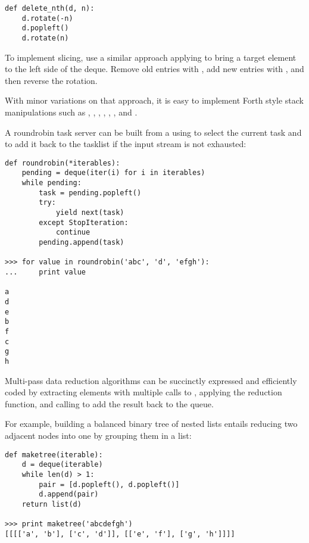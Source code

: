 \begin{verbatim}
def delete_nth(d, n):
    d.rotate(-n)
    d.popleft()
    d.rotate(n)
\end{verbatim}

To implement  slicing, use a similar approach applying
 to bring a target element to the left side of the deque.
Remove old entries with , add new entries with
, and then reverse the rotation.

With minor variations on that approach, it is easy to implement Forth style
stack manipulations such as , , , ,
, , and .

A roundrobin task server can be built from a  using
 to select the current task and 
to add it back to the tasklist if the input stream is not exhausted:

\begin{verbatim}
def roundrobin(*iterables):
    pending = deque(iter(i) for i in iterables)
    while pending:
        task = pending.popleft()
        try:
            yield next(task)
        except StopIteration:
            continue
        pending.append(task)

>>> for value in roundrobin('abc', 'd', 'efgh'):
...     print value

a
d
e
b
f
c
g
h

\end{verbatim}


Multi-pass data reduction algorithms can be succinctly expressed and
efficiently coded by extracting elements with multiple calls to
, applying the reduction function, and calling
 to add the result back to the queue.

For example, building a balanced binary tree of nested lists entails
reducing two adjacent nodes into one by grouping them in a list:

\begin{verbatim}
def maketree(iterable):
    d = deque(iterable)
    while len(d) > 1:
        pair = [d.popleft(), d.popleft()]
        d.append(pair)
    return list(d)

>>> print maketree('abcdefgh')
[[[['a', 'b'], ['c', 'd']], [['e', 'f'], ['g', 'h']]]]

\end{verbatim}



